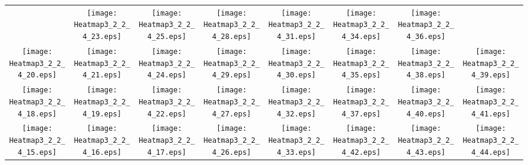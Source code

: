 \documentclass{standalone}
\begin{document}
\renewcommand{\arraystretch}{0}
\setlength{\tabcolsep}{0pt}
\begin{tabular}{ *8{c} }
 & \texttt{[image: Heatmap3\_2\_2\_4\_23.eps]} & \texttt{[image: Heatmap3\_2\_2\_4\_25.eps]} & \texttt{[image: Heatmap3\_2\_2\_4\_28.eps]} & \texttt{[image: Heatmap3\_2\_2\_4\_31.eps]} & \texttt{[image: Heatmap3\_2\_2\_4\_34.eps]} & \texttt{[image: Heatmap3\_2\_2\_4\_36.eps]} &  \\
\texttt{[image: Heatmap3\_2\_2\_4\_20.eps]} & \texttt{[image: Heatmap3\_2\_2\_4\_21.eps]} & \texttt{[image: Heatmap3\_2\_2\_4\_24.eps]} & \texttt{[image: Heatmap3\_2\_2\_4\_29.eps]} & \texttt{[image: Heatmap3\_2\_2\_4\_30.eps]} & \texttt{[image: Heatmap3\_2\_2\_4\_35.eps]} & \texttt{[image: Heatmap3\_2\_2\_4\_38.eps]} & \texttt{[image: Heatmap3\_2\_2\_4\_39.eps]} \\
\texttt{[image: Heatmap3\_2\_2\_4\_18.eps]} & \texttt{[image: Heatmap3\_2\_2\_4\_19.eps]} & \texttt{[image: Heatmap3\_2\_2\_4\_22.eps]} & \texttt{[image: Heatmap3\_2\_2\_4\_27.eps]} & \texttt{[image: Heatmap3\_2\_2\_4\_32.eps]} & \texttt{[image: Heatmap3\_2\_2\_4\_37.eps]} & \texttt{[image: Heatmap3\_2\_2\_4\_40.eps]} & \texttt{[image: Heatmap3\_2\_2\_4\_41.eps]} \\
\texttt{[image: Heatmap3\_2\_2\_4\_15.eps]} & \texttt{[image: Heatmap3\_2\_2\_4\_16.eps]} & \texttt{[image: Heatmap3\_2\_2\_4\_17.eps]} & \texttt{[image: Heatmap3\_2\_2\_4\_26.eps]} & \texttt{[image: Heatmap3\_2\_2\_4\_33.eps]} & \texttt{[image: Heatmap3\_2\_2\_4\_42.eps]} & \texttt{[image: Heatmap3\_2\_2\_4\_43.eps]} & \texttt{[image: Heatmap3\_2\_2\_4\_44.eps]} \\

\end{tabular}
\end{document}
